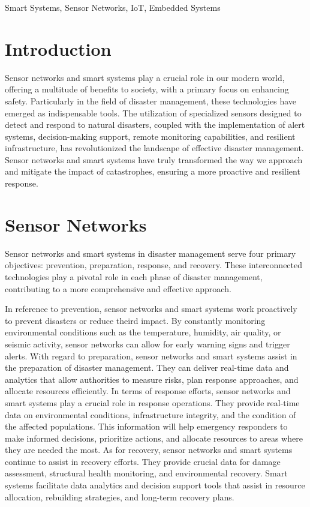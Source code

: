 \documentclass[conference]{IEEEtran}
\begin{document}
\begin{IEEEkeywords}
	Smart Systems, Sensor Networks, IoT, Embedded Systems\par
\end{IEEEkeywords}

\section{Introduction} %
Sensor networks and smart systems play a crucial role in our modern world, offering a multitude of benefits
to society, with a primary focus on enhancing safety. Particularly in the field of disaster management, these
technologies have emerged as indispensable tools. The utilization of specialized sensors designed to detect
and respond to natural disasters, coupled with the implementation of alert systems, decision-making support,
remote monitoring capabilities, and resilient infrastructure, has revolutionized the landscape of effective
disaster management. Sensor networks and smart systems have truly transformed the way we approach and mitigate
the impact of catastrophes, ensuring a more proactive and resilient response.\par

\section{Sensor Networks} %

Sensor networks and smart systems in disaster management serve four primary objectives: prevention, preparation,
response, and recovery. These interconnected technologies play a pivotal role in each phase of disaster
management, contributing to a more comprehensive and
effective approach.\par

In reference to prevention, sensor networks and smart systems work proactively to prevent disasters or reduce
theird impact. By constantly monitoring environmental conditions such as the temperature, humidity, air quality,
or seismic activity, sensor networks can allow for early warning signs and trigger alerts. With regard to
preparation, sensor networks and smart systems assist in the preparation of disaster management. They can
deliver real-time data and analytics that allow authorities to measure risks, plan response approaches, and
allocate resources efficiently. In terms of response efforts, sensor networks and smart systems play a crucial
role in response operations. They provide real-time data on environmental conditions, infrastructure integrity,
and the condition of the affected populations. This information will help emergency responders to make
informed decisions, prioritize actions, and allocate resources to areas where they are needed the most.
As for recovery, sensor networks and smart systems continue to assist in recovery efforts. They provide
crucial data for damage assessment, structural health monitoring, and environmental recovery. Smart systems
facilitate data analytics and decision support tools that assist in resource allocation, rebuilding
strategies, and long-term recovery plans.\par
\end{document}
